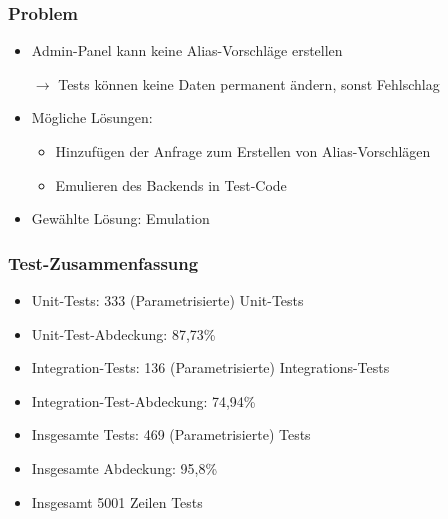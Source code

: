 \begin{frame}\frametitle{Problem}
    \begin{itemize}
        \item Admin-Panel kann keine Alias-Vorschläge erstellen
        \item[$\rightarrow$] Tests können keine Daten permanent ändern, sonst Fehlschlag
        \item Mögliche Lösungen: \begin{itemize}
            \item Hinzufügen der Anfrage zum Erstellen von Alias-Vorschlägen
            \item Emulieren des Backends in Test-Code
        \end{itemize} 
        \pause
        \item Gewählte Lösung: Emulation
    \end{itemize}
\end{frame}

\begin{frame}\frametitle{Test-Zusammenfassung}
    \begin{itemize}
        \item Unit-Tests: 333 (Parametrisierte) Unit-Tests
        \item Unit-Test-Abdeckung: 87,73\%
        \item Integration-Tests: 136 (Parametrisierte) Integrations-Tests
        \item Integration-Test-Abdeckung: 74,94\%
        \item Insgesamte Tests: 469 (Parametrisierte) Tests
        \item Insgesamte Abdeckung: 95,8\% 
        \item Insgesamt 5001 Zeilen Tests
    \end{itemize}
\end{frame}